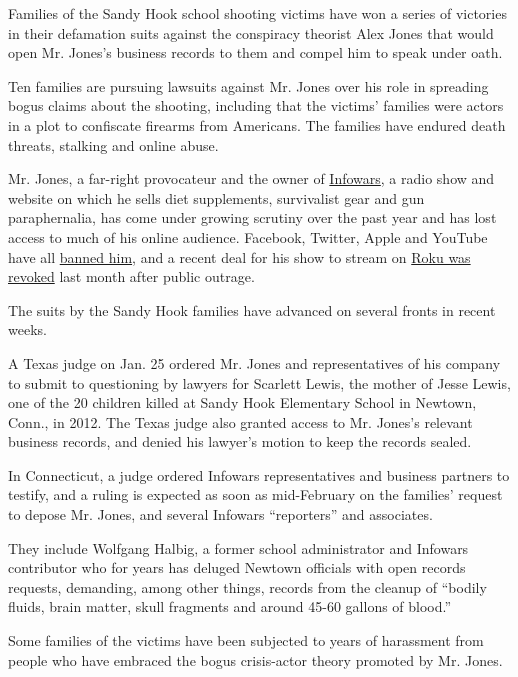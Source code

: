 Families of the Sandy Hook school shooting victims have won a series of
victories in their defamation suits against the conspiracy theorist Alex
Jones that would open Mr. Jones's business records to them and compel
him to speak under oath.

Ten families are pursuing lawsuits against Mr. Jones over his role in
spreading bogus claims about the shooting, including that the victims'
families were actors in a plot to confiscate firearms from Americans.
The families have endured death threats, stalking and online abuse.

Mr. Jones, a far-right provocateur and the owner of
\href{https://www.nytimes3xbfgragh.onion/2019/12/09/us/politics/owen-shroyer-infowars.html}{Infowars},
a radio show and website on which he sells diet supplements, survivalist
gear and gun paraphernalia, has come under growing scrutiny over the
past year and has lost access to much of his online audience. Facebook,
Twitter, Apple and YouTube have all
\href{https://www.nytimes3xbfgragh.onion/2018/08/06/technology/infowars-alex-jones-apple-facebook-spotify.html?module=inline}{banned
him}, and a recent deal for his show to stream on
\href{https://www.nytimes3xbfgragh.onion/2019/01/15/us/politics/alex-jones-infowars-roku.html}{Roku
was revoked} last month after public outrage.

The suits by the Sandy Hook families have advanced on several fronts in
recent weeks.

A Texas judge on Jan. 25 ordered Mr. Jones and representatives of his
company to submit to questioning by lawyers for Scarlett Lewis, the
mother of Jesse Lewis, one of the 20 children killed at Sandy Hook
Elementary School in Newtown, Conn., in 2012. The Texas judge also
granted access to Mr. Jones's relevant business records, and denied his
lawyer's motion to keep the records sealed.

In Connecticut, a judge ordered Infowars representatives and business
partners to testify, and a ruling is expected as soon as mid-February on
the families' request to depose Mr. Jones, and several Infowars
``reporters'' and associates.

They include Wolfgang Halbig, a former school administrator and Infowars
contributor who for years has deluged Newtown officials with open
records requests, demanding, among other things, records from the
cleanup of ``bodily fluids, brain matter, skull fragments and around
45-60 gallons of blood.''

Some families of the victims have been subjected to years of harassment
from people who have embraced the bogus crisis-actor theory promoted by
Mr. Jones.


